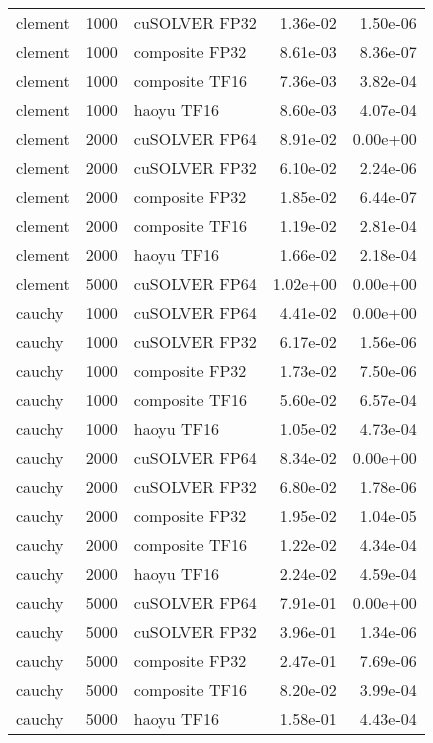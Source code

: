 \begin{table}
\begin{tabular}{lrlrr}
  clement &  1000 &  cuSOLVER FP32 &  1.36e-02 &        1.50e-06 \\
  clement &  1000 & composite FP32 &  8.61e-03 &        8.36e-07 \\
  clement &  1000 & composite TF16 &  7.36e-03 &        3.82e-04 \\
  clement &  1000 &     haoyu TF16 &  8.60e-03 &        4.07e-04 \\
  clement &  2000 &  cuSOLVER FP64 &  8.91e-02 &        0.00e+00 \\
  clement &  2000 &  cuSOLVER FP32 &  6.10e-02 &        2.24e-06 \\
  clement &  2000 & composite FP32 &  1.85e-02 &        6.44e-07 \\
  clement &  2000 & composite TF16 &  1.19e-02 &        2.81e-04 \\
  clement &  2000 &     haoyu TF16 &  1.66e-02 &        2.18e-04 \\
  clement &  5000 &  cuSOLVER FP64 &  1.02e+00 &        0.00e+00 \\
   cauchy &  1000 &  cuSOLVER FP64 &  4.41e-02 &        0.00e+00 \\
   cauchy &  1000 &  cuSOLVER FP32 &  6.17e-02 &        1.56e-06 \\
   cauchy &  1000 & composite FP32 &  1.73e-02 &        7.50e-06 \\
   cauchy &  1000 & composite TF16 &  5.60e-02 &        6.57e-04 \\
   cauchy &  1000 &     haoyu TF16 &  1.05e-02 &        4.73e-04 \\
   cauchy &  2000 &  cuSOLVER FP64 &  8.34e-02 &        0.00e+00 \\
   cauchy &  2000 &  cuSOLVER FP32 &  6.80e-02 &        1.78e-06 \\
   cauchy &  2000 & composite FP32 &  1.95e-02 &        1.04e-05 \\
   cauchy &  2000 & composite TF16 &  1.22e-02 &        4.34e-04 \\
   cauchy &  2000 &     haoyu TF16 &  2.24e-02 &        4.59e-04 \\
   cauchy &  5000 &  cuSOLVER FP64 &  7.91e-01 &        0.00e+00 \\
   cauchy &  5000 &  cuSOLVER FP32 &  3.96e-01 &        1.34e-06 \\
   cauchy &  5000 & composite FP32 &  2.47e-01 &        7.69e-06 \\
   cauchy &  5000 & composite TF16 &  8.20e-02 &        3.99e-04 \\
   cauchy &  5000 &     haoyu TF16 &  1.58e-01 &        4.43e-04 \\

\end{tabular}
\end{table}
